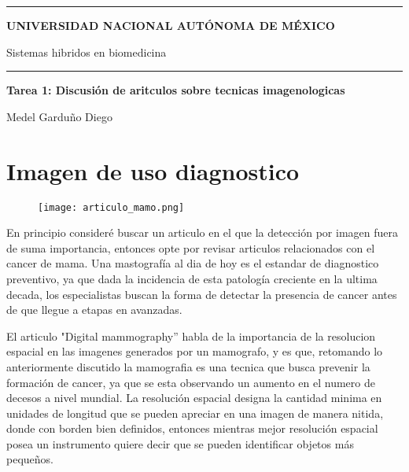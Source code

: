 \documentclass{article}
\begin{document}
\thispagestyle{plain}


\hrule
\begin{center}
    {\Large \textbf{UNIVERSIDAD NACIONAL AUTÓNOMA DE MÉXICO}}
    \vspace{10pt}

    {\Large{{Sistemas hibridos en biomedicina}}}
    
    
    \vspace{10pt}

    \hrule

    \vspace{20pt}


    {\Huge \textbf{Tarea 1: Discusión de aritculos sobre tecnicas imagenologicas}}\\
\end{center}

\hdashrule{\linewidth}{1pt}{1mm}

\begin{flushright}
    {\small Medel Garduño Diego} 
\end{flushright}



\section{Imagen de uso diagnostico}


\begin{figure}[h!]
    \centering
    \texttt{[image: articulo\_mamo.png]}
\end{figure}

En principio consideré buscar un articulo en el que la detección por imagen fuera de suma importancia, entonces opte por revisar articulos relacionados con el cancer de mama. Una mastografía al dia de hoy es el estandar de diagnostico preventivo, ya que dada la incidencia de esta patología creciente en la ultima decada, los especialistas buscan la forma de detectar la presencia de cancer antes de que llegue a etapas en avanzadas.

\vspace{10pt} 



El articulo "Digital mammography'' habla de la importancia de la resolucion espacial en las imagenes generados por un mamografo, y es que, retomando lo anteriormente discutido la mamografia es una tecnica que busca prevenir la formación de cancer, ya que se esta observando un aumento en el numero de decesos a nivel mundial. La resolución espacial designa la cantidad minima en unidades de longitud que se pueden apreciar en una imagen de manera nitida, donde con borden bien definidos, entonces mientras mejor resolución espacial posea un instrumento quiere decir que se pueden identificar objetos más pequeños. 
\end{document}
